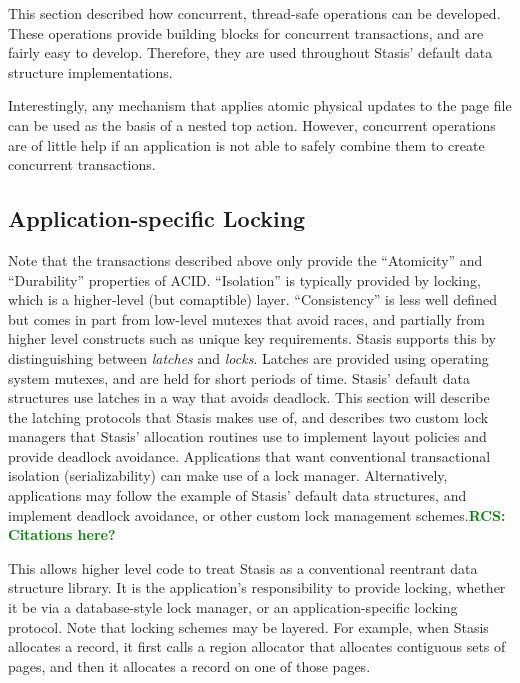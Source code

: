 \documentclass[letterpaper,twocolumn,10pt]{article}
\newcommand{\yad}{Stasis\xspace}
\newcommand{\yads}{Stasis'\xspace}
\newcommand{\rcs}[1]{\textcolor{green}{\bf RCS: #1}}
\begin{document}
This section described how concurrent, thread-safe operations can be
developed.  These operations provide building blocks for concurrent
transactions, and are fairly easy to develop.  Therefore, they are
used throughout \yads default data structure implementations.  

Interestingly, any mechanism that applies atomic physical updates to
the page file can be used as the basis of a nested top action.
However, concurrent operations are of little help if an application is
not able to safely combine them to create concurrent transactions.

\subsection{Application-specific Locking}

Note that the transactions described above only provide the
``Atomicity'' and ``Durability'' properties of ACID.  ``Isolation'' is
typically provided by locking, which is a higher-level (but
comaptible) layer.  ``Consistency'' is less well defined but comes in
part from low-level mutexes that avoid races, and partially from
higher level constructs such as unique key requirements.  \yad
supports this by distinguishing between {\em latches} and {\em locks}.
Latches are provided using operating system mutexes, and are held for
short periods of time.  \yads default data structures use latches in a
way that avoids deadlock.  This section will describe the latching
protocols that \yad makes use of, and describes two custom lock
managers that \yads allocation routines use to implement layout 
policies and provide deadlock avoidance.  Applications that want
conventional transactional isolation (serializability) can make 
use of a lock manager.  Alternatively, applications may follow 
the example of \yads default data structures, and implement 
deadlock avoidance, or other custom lock management schemes.\rcs{Citations here?}

This allows higher level code to treat \yad as a conventional
reentrant data structure library.  It is the application's
responsibility to provide locking, whether it be via a database-style
lock manager, or an application-specific locking protocol.  Note that
locking schemes may be layered.  For example, when \yad allocates a
record, it first calls a region allocator that allocates contiguous
sets of pages, and then it allocates a record on one of those pages.
\end{document}
